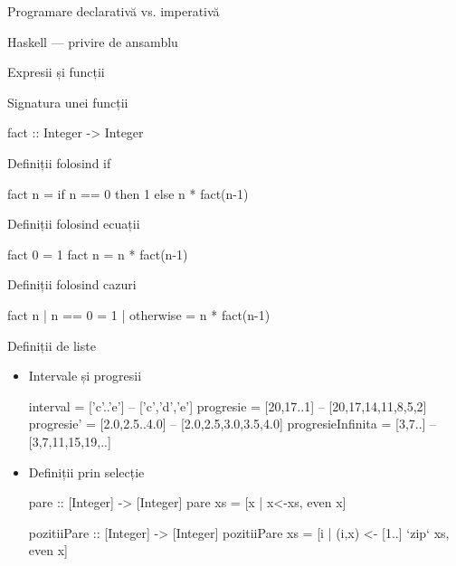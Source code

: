 \documentclass[xcolor=pdftex,romanian,colorlinks]{beamer}
\begin{document}
\begin{section}{Programare declarativă vs. imperativă}
\end{section}

\begin{section}{Haskell --- privire de ansamblu}
\begin{frame}[fragile]{Expresii și funcții}
\begin{block}{Signatura unei funcții}
\vspace{-2ex}
\begin{asciihs}
fact :: Integer -> Integer
\end{asciihs}
\end{block}
\begin{block}{Definiții folosind if}
\vspace{-2ex}
\begin{asciihs}
fact n = if n == 0 then 1
         else n * fact(n-1)
\end{asciihs}
\end{block}
\vfill \begin{block}{Definiții folosind ecuații}
\vspace{-2ex}
\begin{asciihs}
fact 0 = 1
fact n = n * fact(n-1)
\end{asciihs}
\end{block}
\vfill 
\begin{block}{Definiții folosind cazuri}
\vspace{-2ex}
\begin{asciihs}
fact n
  | n == 0 = 1
  | otherwise = n * fact(n-1)
\end{asciihs}
\end{block}
\end{frame}

\begin{frame}[fragile]{Definiții de liste}
\begin{itemize}
\item Intervale și progresii
\begin{asciihs}
interval = ['c'..'e']       -- ['c','d','e']
progresie = [20,17..1]      -- [20,17,14,11,8,5,2]
progresie' = [2.0,2.5..4.0] -- [2.0,2.5,3.0,3.5,4.0]
progresieInfinita = [3,7..] -- [3,7,11,15,19,..]
\end{asciihs}
\item Definiții prin selecție
\begin{asciihs}
pare :: [Integer] -> [Integer]
pare xs = [x | x<-xs, even x]

pozitiiPare :: [Integer] -> [Integer]
pozitiiPare xs = [i | (i,x) <- [1..] `zip` xs, even x]
\end{asciihs}
\end{itemize}
\end{frame}


\end{section}
\end{document}
